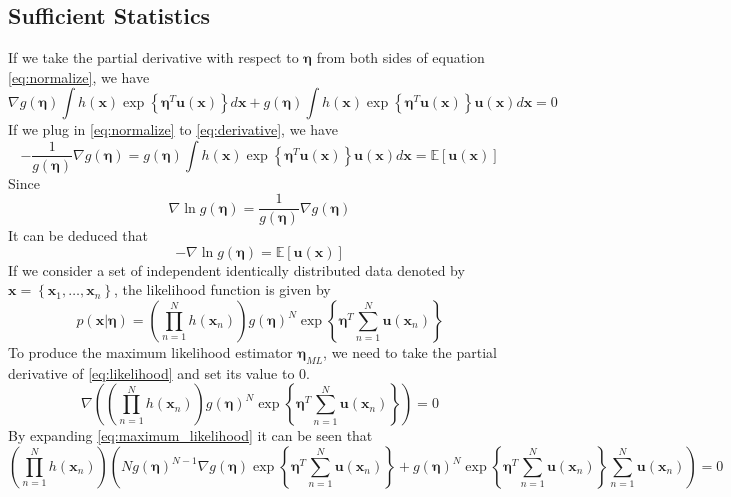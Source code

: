 \documentclass[12pt]{article}
\begin{document}
\subsection{Sufficient Statistics}
If we take the partial derivative with respect to $\bm{\eta}$ from both sides of equation \ref{eq:normalize}, we have
\begin{equation}\label{eq:derivative}
    \nabla g(\bm{\eta})\int{h(\mathbf{x})\exp\left\{\bm{\eta}^T\mathbf{u}(\mathbf{x})\right\}}d\mathbf{x} + g(\bm{\eta})\int{h(\mathbf{x})\exp\left\{\bm{\eta}^T\mathbf{u}(\mathbf{x})\right\}}\mathbf{u}(\mathbf{x})d\mathbf{x}=0
\end{equation}
If we plug in \ref{eq:normalize} to \ref{eq:derivative}, we have
\begin{equation}
    -\frac{1}{g(\bm{\eta})}\nabla g(\bm{\eta})=g(\bm{\eta})\int{h(\mathbf{x})\exp\left\{\bm{\eta}^T\mathbf{u}(\mathbf{x})\right\}}\mathbf{u}(\mathbf{x})d\mathbf{x}=\mathbb{E}[\mathbf{u}(\mathbf{x})]
\end{equation}
Since
\begin{displaymath}
    \nabla \ln{g(\bm{\eta})} = \frac{1}{g(\bm{\eta})}\nabla g(\bm{\eta})
\end{displaymath}
It can be deduced that
\begin{equation}
    -\nabla \ln{g(\bm{\eta})} = \mathbb{E}[\mathbf{u}(\mathbf{x})]
\end{equation}
If we consider a set of independent identically distributed data denoted by $\mathbf{x}=\left\{\mathbf{x}_1,\dots,\mathbf{x}_n\right\}$, the likelihood function is given by
\begin{equation}\label{eq:likelihood}
    p(\mathbf{x}|\bm{\eta})=\left(\prod_{n=1}^{N}h(\mathbf{x}_n)\right)g(\bm{\eta})^N\exp\left\{\bm{\eta}^T\sum_{n=1}^N\mathbf{u}(\mathbf{x}_n)\right\}
\end{equation}
To produce the maximum likelihood estimator $\bm{\eta}_{ML}$, we need to take the partial derivative of \ref{eq:likelihood} and set its value to 0.
\begin{equation}\label{eq:maximum_likelihood}
    \nabla \left(\left(\prod_{n=1}^{N}h(\mathbf{x}_n)\right)g(\bm{\eta})^N\exp\left\{\bm{\eta}^T\sum_{n=1}^N\mathbf{u}(\mathbf{x}_n)\right\}\right) =0
\end{equation}
By expanding \ref{eq:maximum_likelihood} it can be seen that
\begin{displaymath}
    \left(\prod_{n=1}^{N}h(\mathbf{x}_n)\right)\left(Ng(\bm{\eta})^{N-1}\nabla g(\bm{\eta})\exp\left\{\bm{\eta}^T\sum_{n=1}^N\mathbf{u}(\mathbf{x}_n)\right\}+g(\bm{\eta})^N \exp\left\{\bm{\eta}^T\sum_{n=1}^N\mathbf{u}(\mathbf{x}_n)\right\}\sum_{n=1}^N\mathbf{u}(\mathbf{x}_n)\right)=0
\end{displaymath}
\end{document}
